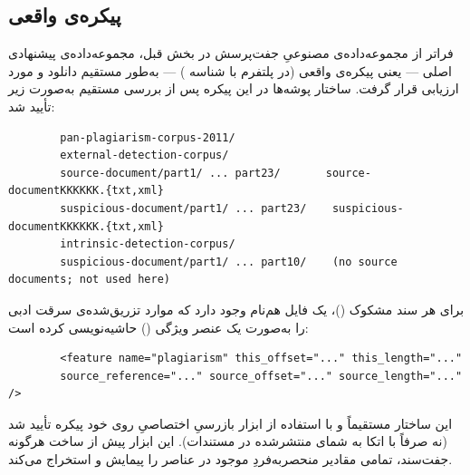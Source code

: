 \documentclass[11pt,a4paper]{article}
\begin{document}
	\subsection{پیکره‌ی واقعی }
	\label{sec:pan-pc11-dataset}
	
	فراتر از مجموعه‌داده‌ی مصنوعیِ جفت‌پرسش در بخش قبل، مجموعه‌داده‌ی پیشنهادی اصلی — یعنی پیکره‌ی واقعی  (در پلتفرم  با شناسه ) — به‌طور مستقیم دانلود و مورد ارزیابی قرار گرفت. ساختار پوشه‌ها در این پیکره پس از بررسی مستقیم به‌صورت زیر تأیید شد:
	


\begin{latin}
	\begin{lstlisting}
		pan-plagiarism-corpus-2011/
		external-detection-corpus/
		source-document/part1/ ... part23/       source-documentKKKKKK.{txt,xml}
		suspicious-document/part1/ ... part23/    suspicious-documentKKKKKK.{txt,xml}
		intrinsic-detection-corpus/
		suspicious-document/part1/ ... part10/    (no source documents; not used here)
	\end{lstlisting}
\end{latin}

برای هر سند مشکوک ()، یک فایل  هم‌نام وجود دارد که موارد تزریق‌شده‌ی سرقت ادبی را به‌صورت یک عنصر ویژگی () حاشیه‌نویسی کرده است:

\begin{latin}
	\begin{lstlisting}
		<feature name="plagiarism" this_offset="..." this_length="..."
		source_reference="..." source_offset="..." source_length="..." />
	\end{lstlisting}
\end{latin}

	
	این ساختار مستقیماً و با استفاده از ابزار بازرسیِ اختصاصیِ  روی خود پیکره تأیید شد (نه صرفاً با اتکا به شمای منتشرشده در مستندات). این ابزار پیش از ساخت هرگونه جفت‌سند، تمامی مقادیر منحصربه‌فردِ موجود در عناصر  را پیمایش و استخراج می‌کند.
	
\end{document}
